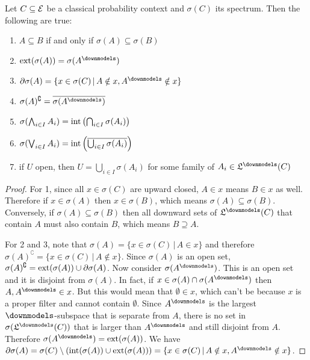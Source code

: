 \begin{mathSection}
	\begin{prop}
		Let $C \subseteq \mathcal{E}$ be a classical probability context and $\sigma(C)$ its spectrum. Then the following are true:
		\begin{enumerate}
			\item $A \subseteq B$ if and only if $\sigma(A) \subseteq \sigma(B)$
			\item $\exterior(\sigma(A)) = \sigma(A^{\separate})$
			\item $\partial \sigma(A) = \{ x \in \sigma(C) \, | \, A \notin x, A^{\separate} \notin x \}$
			\item $\sigma(A)^{\complement} = \overline{\sigma(A^{\separate})}$
			\item $\sigma(\bigwedge_{i \in I} A_i) = \operatorname{int}\left(\bigcap_{i \in I} \sigma(A_i)\right)$
			\item $\sigma(\bigvee_{i \in I} A_i) = \operatorname{int}\left(\overline{\bigcup_{i \in I} \sigma(A_i)}\right)$
			\item if $U$ open, then $U = \bigcup_{i \in I} \sigma(A_i)$ for some family of $A_i \in \mathfrak{L}^\separate(C)$
		\end{enumerate}
	\end{prop}
	
	\begin{proof}
		For 1, since all $x \in \sigma(C)$ are upward closed, $A \in x$ means $B \in x$ as well. Therefore if $x \in \sigma(A)$ then $x \in \sigma(B)$, which means $\sigma(A) \subseteq \sigma(B)$. Conversely, if $\sigma(A) \subseteq \sigma(B)$ then all downward sets of $\mathfrak{L}^\separate(C)$ that contain $A$ must also contain $B$, which means $B \supseteq A$.
		
		For 2 and 3, note that $\sigma(A) = \{ x \in \sigma(C) \, | \, A \in x \}$ and therefore $\sigma(A)^{\complement} = \{ x \in \sigma(C) \, | \, A \notin x \}$. Since $\sigma(A)$ is an open set, $\sigma(A)^{\complement} = \operatorname{ext}(\sigma(A)) \cup \partial \sigma(A)$. Now consider $\sigma(A^{\separate})$. This is an open set and it is disjoint from $\sigma(A)$. In fact, if $x \in \sigma(A) \cap \sigma(A^{\separate})$ then $A, A^{\separate} \in x$. But this would mean that $\emptyset \in x$, which can't be because $x$ is a proper filter and cannot contain $\emptyset$. Since $A^{\separate}$ is the largest $\separate$-subspace that is separate from $A$, there is no set in $\sigma(\mathfrak{L}^\separate(C))$ that is larger than $A^{\separate}$ and still disjoint from $A$. Therefore $\sigma(A^{\separate}) = \exterior(\sigma(A))$. We have $\partial \sigma(A) = \sigma(C) \setminus (\interior(\sigma(A))\cup\exterior(\sigma(A))) = \{ x \in \sigma(C) \, | \, A \notin x, A^{\separate} \notin x \}$.
		

\end{proof}
\end{mathSection}
